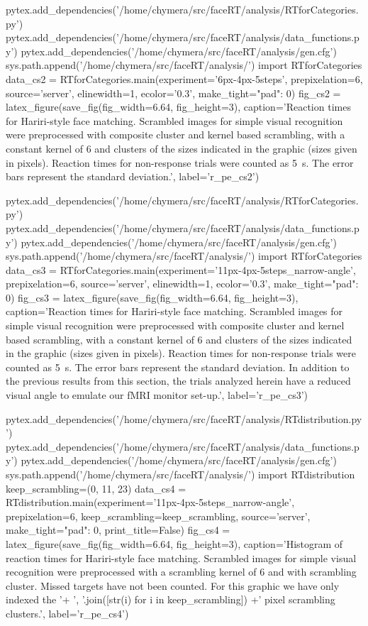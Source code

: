 \begin{pycode}
pytex.add_dependencies('/home/chymera/src/faceRT/analysis/RTforCategories.py')
pytex.add_dependencies('/home/chymera/src/faceRT/analysis/data_functions.py')
pytex.add_dependencies('/home/chymera/src/faceRT/analysis/gen.cfg')
sys.path.append('/home/chymera/src/faceRT/analysis/')
import RTforCategories
data_cs2 = RTforCategories.main(experiment='6px-4px-5steps', prepixelation=6, source='server', elinewidth=1, ecolor='0.3', make_tight={"pad": 0})
fig_cs2 = latex_figure(save_fig(fig_width=6.64, fig_height=3), caption='Reaction times for Hariri-style face matching. Scrambled images for simple visual recognition were preprocessed with composite cluster and kernel based scrambling, with a constant kernel of \SI{6}{\pixel} and clusters of the sizes indicated in the graphic (sizes given in pixels). Reaction times for non-response trials were counted as \SI{5}{\second}. The error bars represent the standard deviation.', label='r_pe_cs2')
\end{pycode}
\begin{pycode}
pytex.add_dependencies('/home/chymera/src/faceRT/analysis/RTforCategories.py')
pytex.add_dependencies('/home/chymera/src/faceRT/analysis/data_functions.py')
pytex.add_dependencies('/home/chymera/src/faceRT/analysis/gen.cfg')
sys.path.append('/home/chymera/src/faceRT/analysis/')
import RTforCategories
data_cs3 = RTforCategories.main(experiment='11px-4px-5steps_narrow-angle', prepixelation=6, source='server', elinewidth=1, ecolor='0.3', make_tight={"pad": 0})
fig_cs3 = latex_figure(save_fig(fig_width=6.64, fig_height=3), caption='Reaction times for Hariri-style face matching. Scrambled images for simple visual recognition were preprocessed with composite cluster and kernel based scrambling, with a constant kernel of \SI{6}{\pixel} and clusters of the sizes indicated in the graphic (sizes given in pixels). Reaction times for non-response trials were counted as \SI{5}{\second}. The error bars represent the standard deviation. In addition to the previous results from this section, the trials analyzed herein have a reduced visual angle to emulate our fMRI monitor set-up.', label='r_pe_cs3')
\end{pycode}
\begin{pycode}
pytex.add_dependencies('/home/chymera/src/faceRT/analysis/RTdistribution.py')
pytex.add_dependencies('/home/chymera/src/faceRT/analysis/data_functions.py')
pytex.add_dependencies('/home/chymera/src/faceRT/analysis/gen.cfg')
sys.path.append('/home/chymera/src/faceRT/analysis/')
import RTdistribution
keep_scrambling=(0, 11, 23)
data_cs4 = RTdistribution.main(experiment='11px-4px-5steps_narrow-angle', prepixelation=6, keep_scrambling=keep_scrambling, source='server', make_tight={"pad": 0}, print_title=False)
fig_cs4 = latex_figure(save_fig(fig_width=6.64, fig_height=3), caption='Histogram of reaction times for Hariri-style face matching. Scrambled images for simple visual recognition were preprocessed with a scrambling kernel of \SI{6}{\pixel} and with scrambling cluster. Missed targets have not been counted. For this graphic we have only indexed the '+ ', '.join([str(i) for i in keep_scrambling]) +' pixel scrambling clusters.', label='r_pe_cs4')
\end{pycode}
